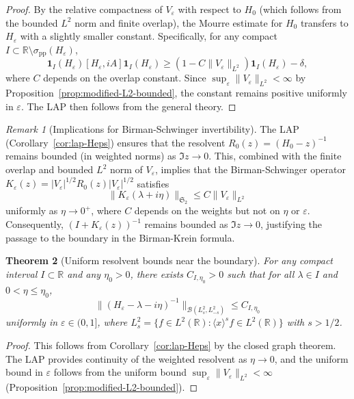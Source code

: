 ﻿\documentclass[12pt,a4paper]{article}
\newtheorem{theorem}{Theorem}[section]
\theoremstyle{definition}
\theoremstyle{remark}
\newtheorem{remark}[theorem]{Remark}
\newcommand{\RR}{\mathbb{R}}
\begin{document}
\begin{proof}
By the relative compactness of $V_\varepsilon$ with respect to $H_0$ (which follows from the bounded $L^2$ norm and finite overlap), the Mourre estimate for $H_0$ transfers to $H_\varepsilon$ with a slightly smaller constant. Specifically, for any compact $I \subset \RR \setminus \sigma_{\mathrm{pp}}(H_\varepsilon)$,
\[
  \mathbf{1}_I(H_\varepsilon) [H_\varepsilon, iA] \mathbf{1}_I(H_\varepsilon) \geq (1 - C\|V_\varepsilon\|_{L^2}) \mathbf{1}_I(H_\varepsilon) - \delta,
\]
where $C$ depends on the overlap constant. Since $\sup_\varepsilon \|V_\varepsilon\|_{L^2} < \infty$ by Proposition~\ref{prop:modified-L2-bounded}, the constant remains positive uniformly in $\varepsilon$. The LAP then follows from the general theory.
\end{proof}

\begin{remark}[Implications for Birman-Schwinger invertibility]
\label{rem:BS-invertibility}
The LAP (Corollary~\ref{cor:lap-Heps}) ensures that the resolvent $R_0(z) = (H_0 - z)^{-1}$ remains bounded (in weighted norms) as $\Im z \to 0$. This, combined with the finite overlap and bounded $L^2$ norm of $V_\varepsilon$, implies that the Birman-Schwinger operator $K_\varepsilon(z) = |V_\varepsilon|^{1/2} R_0(z) |V_\varepsilon|^{1/2}$ satisfies
\[
  \|K_\varepsilon(\lambda + i\eta)\|_{\mathfrak{S}_2} \leq C \|V_\varepsilon\|_{L^2}
\]
uniformly as $\eta \to 0^+$, where $C$ depends on the weights but not on $\eta$ or $\varepsilon$. Consequently, $(I + K_\varepsilon(z))^{-1}$ remains bounded as $\Im z \to 0$, justifying the passage to the boundary in the Birman-Krein formula.
\end{remark}

\begin{theorem}[Uniform resolvent bounds near the boundary]
\label{thm:uniform-resolvent-bounds}
For any compact interval $I \subset \RR$ and any $\eta_0 > 0$, there exists $C_{I,\eta_0} > 0$ such that for all $\lambda \in I$ and $0 < \eta \leq \eta_0$,
\[
  \|(H_\varepsilon - \lambda - i\eta)^{-1}\|_{\mathcal{B}(L^2_{s}, L^2_{-s})} \leq C_{I,\eta_0}
\]
uniformly in $\varepsilon \in (0,1]$, where $L^2_s = \{f \in L^2(\RR) : \langle x \rangle^s f \in L^2(\RR)\}$ with $s > 1/2$.
\end{theorem}

\begin{proof}
This follows from Corollary~\ref{cor:lap-Heps} by the closed graph theorem. The LAP provides continuity of the weighted resolvent as $\eta \to 0$, and the uniform bound in $\varepsilon$ follows from the uniform bound $\sup_\varepsilon \|V_\varepsilon\|_{L^2} < \infty$ (Proposition~\ref{prop:modified-L2-bounded}).
\end{proof}
\end{document}

